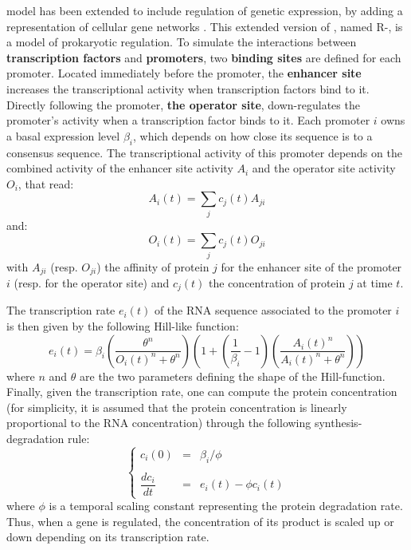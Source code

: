 {\aevol} model has been extended to include regulation of genetic expression, by adding a representation of cellular gene networks \citep{beslon-et-al-2010a}. This extended version of {\aevol}, named R-{\aevol}, is a model of prokaryotic regulation. To simulate the interactions between \textbf{transcription factors} and \textbf{promoters}, two \textbf{binding sites} are defined for each promoter. Located immediately before the promoter, the \textbf{enhancer site} increases the transcriptional activity when transcription factors bind to it. Directly following the promoter, \textbf{the operator site}, down-regulates the promoter's activity when a transcription factor binds to it. Each promoter $i$ owns a basal expression level $\beta_i$, which depends on how close its sequence is to a consensus sequence. The transcriptional activity of this promoter depends on the combined activity of the enhancer site activity $A_i$ and the operator site activity $O_i$, that read:
\begin{equation}
A_i(t) = \sum_j c_j(t)A_{ji}
\end{equation}
and:
\begin{equation}
O_i(t) = \sum_j c_j(t)O_{ji}
\end{equation}
with $A_{ji}$ (resp. $O_{ji}$) the affinity of protein $j$ for the enhancer site of the promoter $i$ (resp. for the operator site) and $c_j(t)$ the concentration of protein $j$ at time $t$.

The transcription rate $e_i(t)$ of the RNA sequence associated to the promoter $i$ is then given by the following Hill-like function:
\begin{equation}
e_i(t) = \beta_i \left( \dfrac{\theta^n}{O_i(t)^n+\theta^n} \right) \left( 1 + \left( \dfrac{1}{\beta_i}-1\right) \left( \dfrac{A_i(t)^n}{A_i(t)^n+\theta^n} \right) \right)
\end{equation}
where $n$ and $\theta$ are the two parameters defining the shape of the Hill-function. Finally, given the transcription rate, one can compute the protein concentration (for simplicity, it is assumed that the protein concentration is linearly proportional to the RNA concentration) through the following synthesis-degradation rule:
\begin{equation}
\left\{
\begin{array}{rcl}
c_i(0) & = & \beta_i/\phi\\\\
\dfrac{d c_i}{d t} & = & e_i(t) - \phi c_i(t)
\end{array}
\right.
\end{equation}
where $\phi$ is a temporal scaling constant representing the protein degradation rate. Thus, when a gene is regulated, the concentration of its product is scaled up or down depending on its transcription rate.

